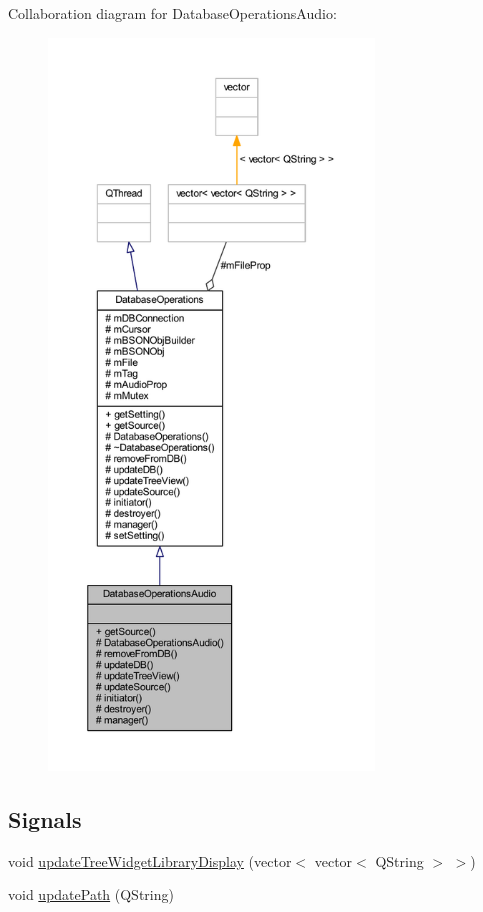 Collaboration diagram for Database\-Operations\-Audio\-:
\nopagebreak
\begin{figure}[H]
\begin{center}
\leavevmode
\includegraphics[height=550pt]{class_database_operations_audio__coll__graph}
\end{center}
\end{figure}
\subsection*{Signals}
\begin{DoxyCompactItemize}
\item 
void \hyperlink{class_database_operations_audio_a663fb07afd5d0c4c0b0de23fd2c19ad1}{update\-Tree\-Widget\-Library\-Display} (vector$<$ vector$<$ Q\-String $>$ $>$)
\item 
void \hyperlink{class_database_operations_audio_ae28ef899c95c7b5d660d1898f97a0052}{update\-Path} (Q\-String)
\end{DoxyCompactItemize}
